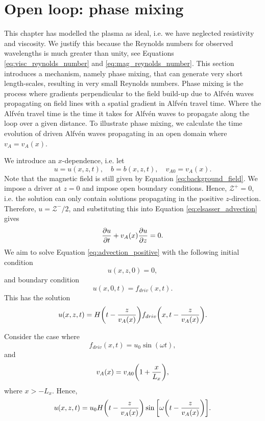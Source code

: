 \section{Open loop: phase mixing}
\label{sec:phase_mixing}

This chapter has modelled the plasma as ideal, i.e. we have neglected resistivity and viscosity. We justify this because the Reynolds numbers for observed wavelengths is much greater than unity, see Equations \eqref{eq:visc_reynolds_number} and \eqref{eq:mag_reynolds_number}. This section introduces a mechanism, namely phase mixing, that can generate very short length-scales, resulting in very small Reynolds numbers. Phase mixing is the process where gradients perpendicular to the field build-up due to Alfv\'en waves propagating on field lines with a spatial gradient in Alfvén travel time. Where the Alfv\'en travel time is the time it takes for Alfv\'en waves to propagate along the loop over a given distance. To illustrate phase mixing, we calculate the time evolution of driven Alfv\'en waves propagating in an open domain where $v_A=v_A(x)$.

We introduce an $x$-dependence, i.e. let
\[u = u(x,z,t),\quad b = b(x,z,t),\quad v_{A0} = v_A(x).\]
Note that the magnetic field is still given by Equation \eqref{eq:background_field}.
We impose a driver at $z=0$ and impose open boundary conditions. Hence, $\mathcal{Z}^+=0$, i.e. the solution can only contain solutions propagating in the positive $z$-direction. Therefore, $u=\mathcal{Z}^-/2$, and substituting this into Equation \eqref{eq:elsasser_advection} gives
\begin{equation}
    \label{eq:advection_positive}
    \pdv{u}{t}+v_A(x)\pdv{u}{z}=0.
\end{equation}
We aim to solve Equation \eqref{eq:advection_positive} with the following initial condition
\begin{equation}
    u(x,z,0) = 0,
\end{equation}
and boundary condition
\begin{equation}
    u(x,0,t) = f_{driv}(x,t).
\end{equation}
This has the solution
\begin{equation}
    u(x,z,t) = H\qty(t - \frac{z}{v_A(x)})f_{driv}\qty(x,t - \frac{z}{v_A(x)}).
\end{equation}

Consider the case where
\begin{equation}
    f_{driv}(x, t) = u_0\sin(\omega t),
\end{equation}
and
\begin{equation}
    v_A(x) = v_{A0}\qty(1+\frac{x}{L_x}),
\end{equation}
where $x > -L_x$.
Hence,
\begin{equation}
    u(x,z,t) = u_0H\qty(t - \frac{z}{v_A(x)})\sin\qty[\omega\qty(t - \frac{z}{v_A(x)})].
\end{equation}

